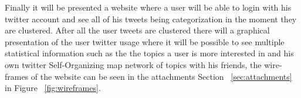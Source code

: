 Finally it will be presented a website where a user will be able to login with his twitter account and see all of his tweets being categorization in the moment they are clustered. After all the user tweets are clustered there will a graphical presentation of the user twitter usage where it will be possible to see multiple statistical information such as the the topics a user is more interested in and his own twitter Self-Organizing map network of topics with his friends, the wire-frames of the website can be seen in the attachments Section ~\ref{sec:attachments} in Figure ~\ref{fig:wireframes}.

